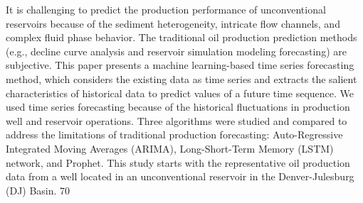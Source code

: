 It is challenging to predict the production performance of unconventional reservoirs because of the sediment heterogeneity, intricate flow channels, and complex fluid phase behavior. The traditional oil production prediction methods (e.g., decline curve analysis and reservoir simulation modeling forecasting) are subjective. This paper presents a machine learning-based time series forecasting method, which considers the existing data as time series and extracts the salient characteristics of historical data to predict values of a future time sequence. We used time series forecasting because of the historical fluctuations in production well and reservoir operations. Three algorithms were studied and compared to address the limitations of traditional production forecasting: Auto-Regressive Integrated Moving Averages (ARIMA), Long-Short-Term Memory (LSTM) network, and Prophet. This study starts with the representative oil production data from a well located in an unconventional reservoir in the Denver-Julesburg (DJ) Basin. 70%